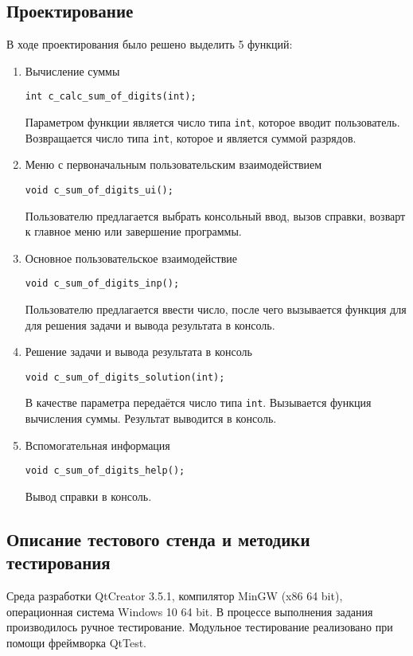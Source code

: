 \documentclass[12pt,a4paper]{report}
\begin{document}
\subsection{Проектирование}
\hspace{\parindent}В ходе проектирования было решено выделить 5 функций:
\begin{enumerate}
 	\item Вычисление суммы
 	
 	\verb+int c_calc_sum_of_digits(int);+
 	
	Параметром функции является число типа \verb+int+, которое вводит пользователь.
	Возвращается число типа \verb+int+, которое и является суммой разрядов.	 
		 
		 
	\item Меню с первоначальным пользовательским взаимодействием
	
	\verb+void c_sum_of_digits_ui();+
	
	Пользователю предлагается выбрать консольный ввод, вызов справки, возварт к главное меню или завершение программы.	
		 
		 
	\item Основное пользовательское взаимодействие
	
	\verb+void c_sum_of_digits_inp();+

	Пользователю предлагается ввести число, после чего вызывается функция для для решения задачи и вывода результата в консоль.
	
	
	\item Решение задачи и вывода результата в консоль
	
	\verb+void c_sum_of_digits_solution(int);+

	В качестве параметра передаётся число типа \verb+int+. Вызывается функция вычисления суммы. Результат выводится в консоль.	
	
	 
	\item Вспомогательная информация
	
	\verb+void c_sum_of_digits_help();+
	
	Вывод справки в консоль.
\end{enumerate}

\subsection{Описание тестового стенда и методики тестирования}
\hspace{\parindent}Среда разработки QtCreator 3.5.1, компилятор MinGW (x86 64 bit), операционная система Windows 10 64 bit.
В процессе выполнения задания производилось ручное тестирование.
Модульное тестирование реализовано при помощи фреймворка QtTest.
\end{document}
